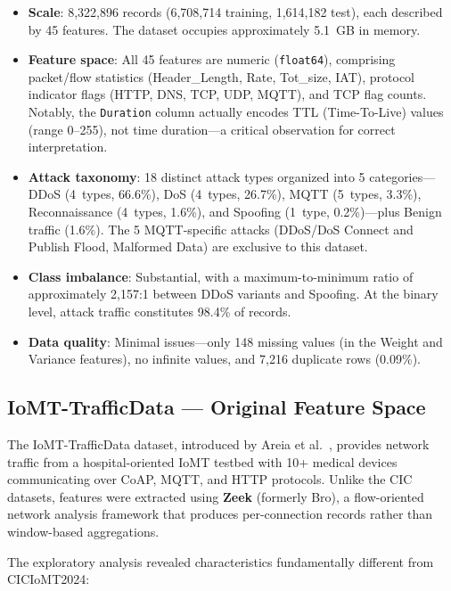 \begin{itemize}
    \item \textbf{Scale}: 8,322,896 records (6,708,714 training, 1,614,182 test), each described by 45 features. The dataset occupies approximately 5.1~GB in memory.
    \item \textbf{Feature space}: All 45 features are numeric (\texttt{float64}), comprising packet/flow statistics (Header\_Length, Rate, Tot\_size, IAT), protocol indicator flags (HTTP, DNS, TCP, UDP, MQTT), and TCP flag counts. Notably, the \texttt{Duration} column actually encodes TTL (Time-To-Live) values (range 0--255), not time duration---a critical observation for correct interpretation.
    \item \textbf{Attack taxonomy}: 18 distinct attack types organized into 5 categories---DDoS (4~types, 66.6\%), DoS (4~types, 26.7\%), MQTT (5~types, 3.3\%), Reconnaissance (4~types, 1.6\%), and Spoofing (1~type, 0.2\%)---plus Benign traffic (1.6\%). The 5 MQTT-specific attacks (DDoS/DoS Connect and Publish Flood, Malformed Data) are exclusive to this dataset.
    \item \textbf{Class imbalance}: Substantial, with a maximum-to-minimum ratio of approximately 2,157:1 between DDoS variants and Spoofing. At the binary level, attack traffic constitutes 98.4\% of records.
    \item \textbf{Data quality}: Minimal issues---only 148 missing values (in the Weight and Variance features), no infinite values, and 7,216 duplicate rows (0.09\%).
\end{itemize}

\subsection{IoMT-TrafficData --- Original Feature Space}
\label{subsec:eda-iomt-traffic}

The IoMT-TrafficData dataset, introduced by Areia et al.~\cite{areia2024iomt}, provides network traffic from a hospital-oriented IoMT testbed with 10+ medical devices communicating over CoAP, MQTT, and HTTP protocols. Unlike the CIC datasets, features were extracted using \textbf{Zeek} (formerly Bro), a flow-oriented network analysis framework that produces per-connection records rather than window-based aggregations.

The exploratory analysis revealed characteristics fundamentally different from CICIoMT2024:

